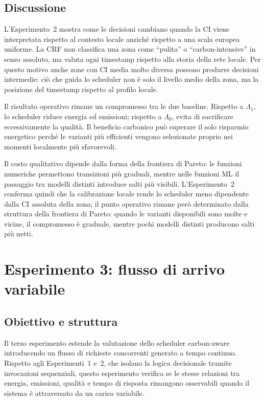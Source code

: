 \clearpage

\subsection{Discussione}
\label{subsec:esperimento2-interpretazione}

L'Esperimento~2 mostra come le decisioni cambiano quando la CI viene
interpretata rispetto al contesto locale anziché rispetto a una scala
europea uniforme. La CRF non classifica una zona come
``pulita'' o ``carbon-intensive'' in senso assoluto, ma valuta ogni
timestamp rispetto alla storia della rete locale. Per questo motivo anche
zone con CI media molto diversa possono produrre decisioni intermedie:
ciò che guida lo scheduler non è solo il livello medio della zona, ma la
posizione del timestamp rispetto al profilo locale.

Il risultato operativo rimane un compromesso tra le due baseline. Rispetto a
$\Lambda_1$, lo scheduler riduce energia ed emissioni; rispetto a
$\Lambda_0$, evita di sacrificare eccessivamente la qualità. Il beneficio
carbonico può superare il solo risparmio energetico perché le varianti più
efficienti vengono selezionate proprio nei momenti localmente più sfavorevoli.

Il costo qualitativo dipende dalla forma della frontiera di Pareto: le funzioni
numeriche permettono transizioni più graduali, mentre nelle funzioni ML il
passaggio tra modelli distinti introduce salti più visibili. L'Esperimento~2 conferma quindi che la calibrazione locale rende lo
scheduler meno dipendente dalla CI assoluta della zona; il punto operativo
rimane però determinato dalla struttura della frontiera di Pareto: quando
le varianti disponibili sono molte e vicine, il compromesso è graduale,
mentre pochi modelli distinti producono salti più netti.

\section{Esperimento 3: flusso di arrivo variabile}
\label{sec:esperimento3}

\subsection{Obiettivo e struttura}
\label{subsec:esperimento3-obiettivo}

Il terzo esperimento estende la valutazione dello scheduler
carbon-aware introducendo un flusso di richieste concorrenti generato a
tempo continuo. Rispetto agli Esperimenti~1 e~2, che isolano la logica
decisionale tramite invocazioni sequenziali, questo esperimento verifica
se le stesse relazioni tra energia, emissioni, qualità e tempo di risposta
rimangono osservabili quando il sistema è attraversato da un carico
variabile.

